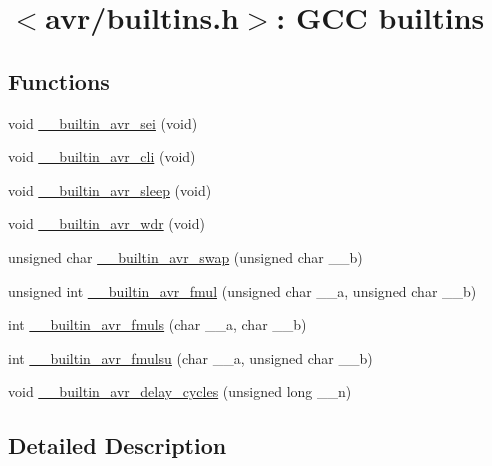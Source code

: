 \hypertarget{group__avr__builtins}{}\section{$<$avr/builtins.h$>$\+: G\+CC builtins}
\label{group__avr__builtins}
\subsection*{Functions}
\begin{DoxyCompactItemize}
\item 
void \hyperlink{group__avr__builtins_gaa9fc5c6054d97fa1b7901789a7f69636}{\+\_\+\+\_\+builtin\+\_\+avr\+\_\+sei} (void)
\item 
void \hyperlink{group__avr__builtins_ga41590bd57be6a89c1b9bcafe523207f2}{\+\_\+\+\_\+builtin\+\_\+avr\+\_\+cli} (void)
\item 
void \hyperlink{group__avr__builtins_gaefc3f29795d2fe18c118e72477ca0e50}{\+\_\+\+\_\+builtin\+\_\+avr\+\_\+sleep} (void)
\item 
void \hyperlink{group__avr__builtins_ga7d79142f6b67d445882ee147f58005c3}{\+\_\+\+\_\+builtin\+\_\+avr\+\_\+wdr} (void)
\item 
unsigned char \hyperlink{group__avr__builtins_gabb7f2d4c4c68a522c7091d7e1f5af955}{\+\_\+\+\_\+builtin\+\_\+avr\+\_\+swap} (unsigned char \+\_\+\+\_\+b)
\item 
unsigned int \hyperlink{group__avr__builtins_gaeb1ebcf726944d2ca734f760b44ccf84}{\+\_\+\+\_\+builtin\+\_\+avr\+\_\+fmul} (unsigned char \+\_\+\+\_\+a, unsigned char \+\_\+\+\_\+b)
\item 
int \hyperlink{group__avr__builtins_gab1307ec7a80d090a91fc9378f83b6b40}{\+\_\+\+\_\+builtin\+\_\+avr\+\_\+fmuls} (char \+\_\+\+\_\+a, char \+\_\+\+\_\+b)
\item 
int \hyperlink{group__avr__builtins_ga816353b87fc6162674570b18d92bc72c}{\+\_\+\+\_\+builtin\+\_\+avr\+\_\+fmulsu} (char \+\_\+\+\_\+a, unsigned char \+\_\+\+\_\+b)
\item 
void \hyperlink{group__avr__builtins_ga1b92d0227413dde09288ce1adae44824}{\+\_\+\+\_\+builtin\+\_\+avr\+\_\+delay\+\_\+cycles} (unsigned long \+\_\+\+\_\+n)
\end{DoxyCompactItemize}


\subsection{Detailed Description}

